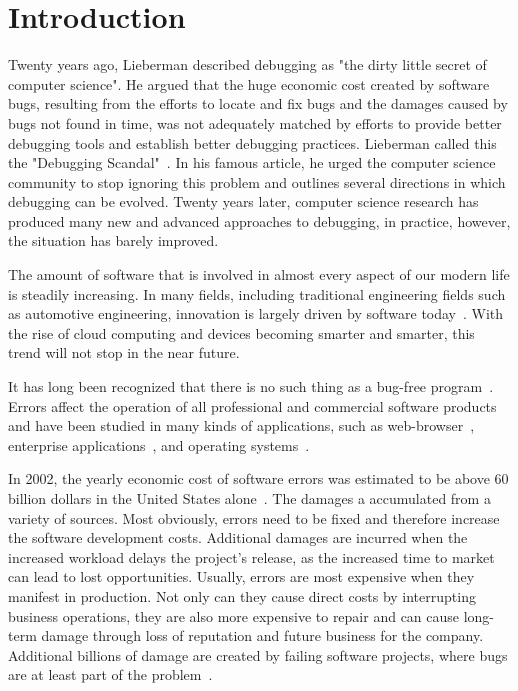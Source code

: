 \chapter{Introduction}
\label{sec:introduction}

Twenty years ago, Lieberman described debugging as "the dirty little secret of computer science".
He argued that the huge economic cost created by software bugs, resulting from the efforts to locate and fix bugs and the damages caused by bugs  not found in time, was not adequately matched by efforts to provide better debugging tools and establish better debugging practices.
Lieberman called this the "Debugging Scandal"~\cite{lieberman97:the_debugging_scandal}.
In his famous article, he urged the computer science community to stop ignoring this problem and outlines several directions in which debugging can be evolved.
Twenty years later, computer science research has produced many new and advanced approaches to debugging, in practice, however, the situation has barely improved.

The amount of software that is involved in almost every aspect of our modern life is steadily increasing.
In many fields, including traditional engineering fields such as automotive engineering, innovation is largely driven by software today~\cite{evans08:invisible_engines_how_software, gorschek10:a_lightweight_innovation_process}.
With the rise of cloud computing and devices becoming smarter and smarter, this trend will not stop in the near future.

It has long been recognized that there is no such thing as a bug-free program~\cite{schwartz71:an_overview_of_bugs}.
Errors affect the operation of all professional and commercial software products and have been studied in many kinds of applications, such as web-browser~\cite{li06:have_things_changed_now}, enterprise applications~\cite{turhan09:data_mining_source_code, sahoo10:an_empirical_study}, and operating systems~\cite{guo10:characterizing_and_predicting_which}. %

In 2002, the yearly economic cost of software errors was estimated to be above 60 billion dollars in the United States alone~\cite{tassey02:the_economic_impacts}. 
The damages a accumulated from a variety of sources.
Most obviously, errors need to be fixed and therefore increase the software development costs.
Additional damages are incurred when the increased workload delays the project's release, as the increased time to market can lead to lost opportunities.
Usually, errors are most expensive when they manifest in production.
Not only can they cause direct costs by interrupting business operations, they are also more expensive to repair and can cause long-term damage through loss of reputation and future business for the company.
Additional billions of damage are created by failing software projects, where bugs are at least part of the problem~\cite{charette05:why_software_fails}.

